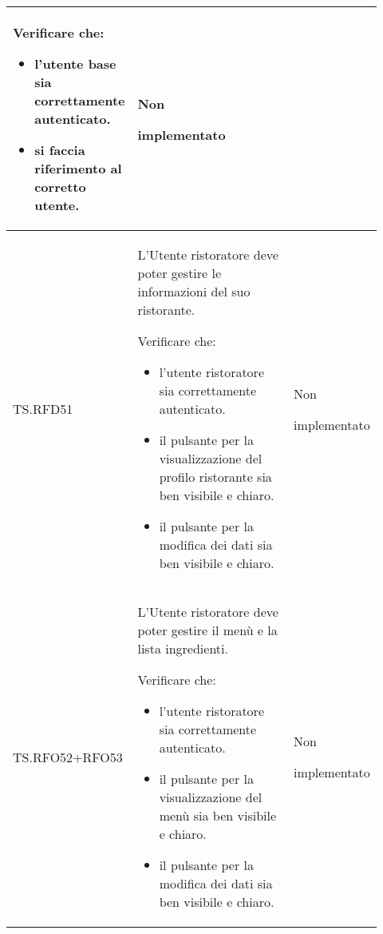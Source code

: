 \begin{longtable}{|p{0.10\linewidth}|p{0.70\linewidth}|p{0.12\linewidth}|}
    Verificare che: 
    \begin{itemize}
        \item l'utente base sia correttamente autenticato.
        \item si faccia riferimento al corretto utente.
    \end{itemize}&
    Non \par implementato  \\
    \hline
    TS.RFD51 & 
    L’Utente ristoratore deve poter gestire le informazioni del suo ristorante. \par 
    Verificare che: 
    \begin{itemize}
        \item l'utente ristoratore sia correttamente autenticato.
        \item il pulsante per la visualizzazione del profilo ristorante sia ben visibile e chiaro.
        \item il pulsante per la modifica dei dati sia ben visibile e chiaro.
    \end{itemize}&
    Non \par implementato  \\
    \hline
    TS.RFO52+RFO53 & 
    L’Utente ristoratore deve poter gestire il menù e la lista ingredienti. \par 
    Verificare che: 
    \begin{itemize}
        \item l'utente ristoratore sia correttamente autenticato.
        \item il pulsante per la visualizzazione del menù sia ben visibile e chiaro.
        \item il pulsante per la modifica dei dati sia ben visibile e chiaro.
    \end{itemize}&
    Non \par implementato  \\
    \hline
\end{longtable}


